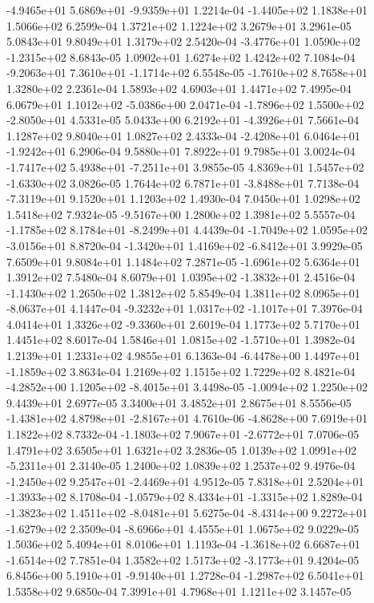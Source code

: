 -4.9465e+01  5.6869e+01 -9.9359e+01  1.2214e-04
-1.4405e+02  1.1838e+01  1.5066e+02  6.2599e-04
1.3721e+02 1.1224e+02 3.2679e+01  3.2961e-05
5.0843e+01 9.8049e+01 1.3179e+02  2.5420e-04
-3.4776e+01  1.0590e+02 -1.2315e+02  8.6843e-05
1.0902e+01 1.6274e+02 1.4242e+02  7.1084e-04
-9.2063e+01  7.3610e+01 -1.1714e+02  6.5548e-05
-1.7610e+02  8.7658e+01  1.3280e+02  2.2361e-04
1.5893e+02 4.6903e+01 1.4471e+02  7.4995e-04
 6.0679e+01  1.1012e+02 -5.0386e+00  2.0471e-04
-1.7896e+02  1.5500e+02 -2.8050e+01  4.5331e-05
 5.0433e+00  6.2192e+01 -4.3926e+01  7.5661e-04
1.1287e+02 9.8040e+01 1.0827e+02  2.4333e-04
-2.4208e+01  6.0464e+01 -1.9242e+01  6.2906e-04
9.5880e+01 7.8922e+01 9.7985e+01  3.0024e-04
-1.7417e+02  5.4938e+01 -7.2511e+01  3.9855e-05
 4.8369e+01  1.5457e+02 -1.6330e+02  3.0826e-05
 1.7644e+02  6.7871e+01 -3.8488e+01  7.7138e-04
-7.3119e+01  9.1520e+01  1.1203e+02  1.4930e-04
7.0450e+01 1.0298e+02 1.5418e+02  7.9324e-05
-9.5167e+00  1.2800e+02  1.3981e+02  5.5557e-04
-1.1785e+02  8.1784e+01 -8.2499e+01  4.4439e-04
-1.7049e+02  1.0595e+02 -3.0156e+01  8.8720e-04
-1.3420e+01  1.4169e+02 -6.8412e+01  3.9929e-05
7.6509e+01 9.8084e+01 1.1484e+02  7.2871e-05
-1.6961e+02  5.6364e+01  1.3912e+02  7.5480e-04
 8.6079e+01  1.0395e+02 -1.3832e+01  2.4516e-04
-1.1430e+02  1.2650e+02  1.3812e+02  5.8549e-04
 1.3811e+02  8.0965e+01 -8.0637e+01  4.1447e-04
-9.3232e+01  1.0317e+02 -1.1017e+01  7.3976e-04
 4.0414e+01  1.3326e+02 -9.3360e+01  2.6019e-04
1.1773e+02 5.7170e+01 1.4451e+02  8.6017e-04
 1.5846e+01  1.0815e+02 -1.5710e+01  1.3982e-04
1.2139e+01 1.2331e+02 4.9855e+01  6.1363e-04
-6.4478e+00  1.4497e+01 -1.1859e+02  3.8634e-04
1.2169e+02 1.1515e+02 1.7229e+02  8.4821e-04
-4.2852e+00  1.1205e+02 -8.4015e+01  3.4498e-05
-1.0094e+02  1.2250e+02  9.4439e+01  2.6977e-05
3.3400e+01 3.4852e+01 2.8675e+01  8.5556e-05
-1.4381e+02  4.8798e+01 -2.8167e+01  4.7610e-06
-4.8628e+00  7.6919e+01  1.1822e+02  8.7332e-04
-1.1803e+02  7.9067e+01 -2.6772e+01  7.0706e-05
1.4791e+02 3.6505e+01 1.6321e+02  3.2836e-05
 1.0139e+02  1.0991e+02 -5.2311e+01  2.3140e-05
1.2400e+02 1.0839e+02 1.2537e+02  9.4976e-04
-1.2450e+02  9.2547e+01 -2.4469e+01  4.9512e-05
 7.8318e+01  2.5204e+01 -1.3933e+02  8.1708e-04
-1.0579e+02  8.4334e+01 -1.3315e+02  1.8289e-04
-1.3823e+02  1.4511e+02 -8.0481e+01  5.6275e-04
-8.4314e+00  9.2272e+01 -1.6279e+02  2.3509e-04
-8.6966e+01  4.4555e+01  1.0675e+02  9.0229e-05
1.5036e+02 5.4094e+01 8.0106e+01  1.1193e-04
-1.3618e+02  6.6687e+01 -1.6514e+02  7.7851e-04
 1.3582e+02  1.5173e+02 -3.1773e+01  9.4204e-05
 6.8456e+00  5.1910e+01 -9.9140e+01  1.2728e-04
-1.2987e+02  6.5041e+01  1.5358e+02  9.6850e-04
7.3991e+01 4.7968e+01 1.1211e+02  3.1457e-05

